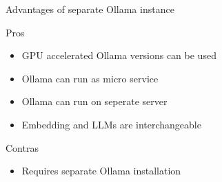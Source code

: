 \documentclass[aspectratio=169]{beamer}
\begin{document}
\begin{frame}{Advantages of separate Ollama instance}
\begin{block}{Pros}
\begin{itemize}
  \item GPU accelerated Ollama versions can be used
  \item Ollama can run as micro service
  \item Ollama can run on seperate server
  \item Embedding and LLMs are interchangeable
\end{itemize}
\end{block}
\begin{block}{Contras}
\begin{itemize}
  \item Requires separate Ollama installation
\end{itemize}
\end{block}
\end{frame}
\end{document}
